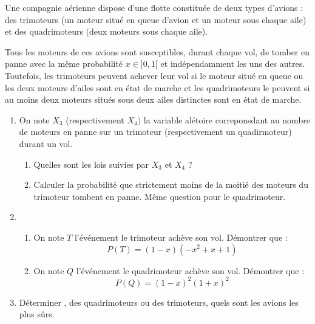 \begin{exercice}[D'après G2E 2014]
Une compagnie aérienne dispose d’une flotte constituée de deux types d’avions : des trimoteurs (un moteur situé en queue d’avion et un moteur sous chaque aile) et des quadrimoteurs (deux moteurs sous chaque aile).

Tous les moteurs de ces avions sont susceptibles, durant chaque vol, de tomber en panne avec la même probabilité $x\in ]0,1[$ et indépendamment les uns des autres. Toutefois, les trimoteurs peuvent achever leur vol si le moteur situé en queue ou les deux moteurs d’ailes sont en  état de marche et les quadrimoteurs le peuvent si au moins deux moteurs situés sous deux ailes distinctes sont en  état de marche.

\begin{enumerate}
\item On note $X_3 $ (respectivement $X_4)$ la variable alétoire correponsdant au nombre de moteurs en panne sur un trimoteur (respectivement un quadirmoteur) durant un vol.
\begin{enumerate}
\item Quelles sont les lois suivies par $X_3$ et  $X_4$ ? 
\item Calculer la probabilité que strictement moins de la moitié des moteurs du trimoteur tombent en panne. Même question pour le quadrimoteur. 
\end{enumerate}
\item 
\begin{enumerate}
\item On note $T$ l'événement \og le trimoteur achève son vol\fg. Démontrer que : 
$$P(T) =(1-x)(-x^2+x+1)$$
\item On note $Q$ l'événement \og le quadrimoteur achève son vol\fg. Démontrer que : 
$$P(Q) =(1-x)^2(1+x)^2$$

\end{enumerate}
\item Déterminer , des quadrimoteurs ou des trimoteurs, quels sont les avions les plus sûrs. 
\end{enumerate}
\end{exercice}

